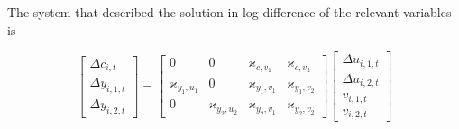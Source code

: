 \documentclass[notes=show]{beamer}
\begin{document}
\bigskip

\begin{frame}%


The system that described the solution in log difference of the relevant
variables is

\begin{equation}
\left[ 
\begin{array}{c}
\Delta c_{i,t} \\ 
\Delta y_{i,1,t} \\ 
\Delta y_{i,2,t}%
\end{array}%
\right] =\left[ 
\begin{array}{cccc}
0 & 0 & \varkappa _{c,v_{1}} & \varkappa _{c,v_{2}} \\ 
\varkappa _{y_{1},u_{1}} & 0 & \varkappa _{y_{1},v_{1}} & \varkappa
_{y_{1},v_{2}} \\ 
0 & \varkappa _{y_{2},u_{2}} & \varkappa _{y_{2},v_{1}} & \varkappa
_{y_{2},v_{2}}%
\end{array}%
\right] \left[ 
\begin{array}{c}
\Delta u_{i,1,t} \\ 
\Delta u_{i,2,t} \\ 
v_{i,1,t} \\ 
v_{i,2,t}%
\end{array}%
\right]
\end{equation}

\transboxout%
\end{frame}%

\bigskip
\end{document}
